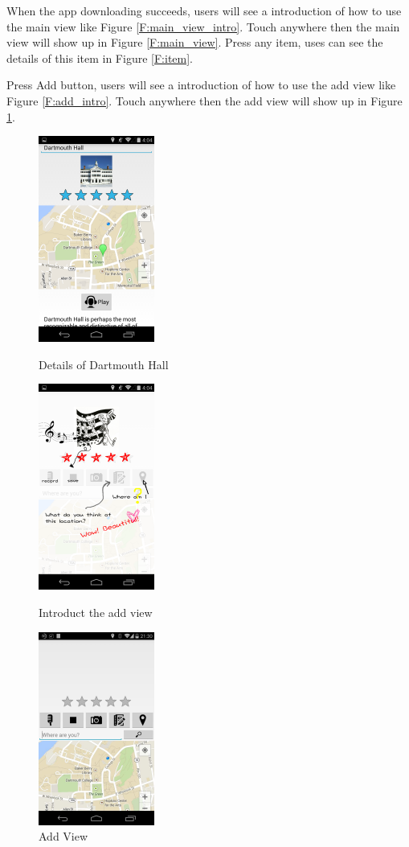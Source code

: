 \documentclass{article}
\begin{document}
When the app downloading succeeds, users will see a introduction of how to use the main view like Figure \ref{F:main_view_intro}. Touch anywhere then the main view will show up in Figure \ref{F:main_view}. Press any item, uses can see the details of this item in Figure \ref{F:item}.

Press Add button, users will see a introduction of how to use the add view like Figure \ref{F:add_intro}. Touch anywhere then the add view will show up in Figure \ref{F:add}.

\begin{figure}[h!]
\begin{minipage}[h!]{0.3\linewidth}
\centering
\includegraphics[width=1.5in]{figures/item.png}
\caption{Details of Dartmouth Hall}
\label{F:item}
\end{minipage}
\begin{minipage}[h!]{0.4\linewidth}
\centering
\includegraphics[width=1.5in]{figures/add_intro.png}
\caption{Introduct the add view}
\label{F:add_intro}
\end{minipage}%
\begin{minipage}[h!]{0.3\linewidth}
\centering
\includegraphics[width=1.5in]{figures/add.jpg}
\caption{Add View}
\label{F:add}
\end{minipage}
\end{figure}
\end{document}
